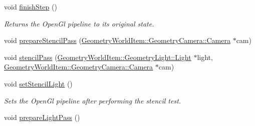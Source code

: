 \begin{DoxyCompactItemize}
\item 
\mbox{\label{class_geometry_engine_1_1_geometry_render_step_1_1_lighting_pass_a980473c9d2e2e77ebdce9e56454f3d3f}} 
void \mbox{\hyperlink{class_geometry_engine_1_1_geometry_render_step_1_1_lighting_pass_a980473c9d2e2e77ebdce9e56454f3d3f}{finish\+Step}} ()
\begin{DoxyCompactList}\small\item\em Returns the Open\+Gl pipeline to its original state. \end{DoxyCompactList}\item 
void \mbox{\hyperlink{class_geometry_engine_1_1_geometry_render_step_1_1_lighting_pass_a1a3280c28b0750c7cad03f01d37374c7}{prepare\+Stencil\+Pass}} (\mbox{\hyperlink{class_geometry_engine_1_1_geometry_world_item_1_1_geometry_camera_1_1_camera}{Geometry\+World\+Item\+::\+Geometry\+Camera\+::\+Camera}} $\ast$cam)
\item 
void \mbox{\hyperlink{class_geometry_engine_1_1_geometry_render_step_1_1_lighting_pass_a42b7f335d4bebdbdd06c3bef142844c0}{stencil\+Pass}} (\mbox{\hyperlink{class_geometry_engine_1_1_geometry_world_item_1_1_geometry_light_1_1_light}{Geometry\+World\+Item\+::\+Geometry\+Light\+::\+Light}} $\ast$light, \mbox{\hyperlink{class_geometry_engine_1_1_geometry_world_item_1_1_geometry_camera_1_1_camera}{Geometry\+World\+Item\+::\+Geometry\+Camera\+::\+Camera}} $\ast$cam)
\item 
\mbox{\label{class_geometry_engine_1_1_geometry_render_step_1_1_lighting_pass_a576001cdaa8f2a377b926d9bcd7b2444}} 
void \mbox{\hyperlink{class_geometry_engine_1_1_geometry_render_step_1_1_lighting_pass_a576001cdaa8f2a377b926d9bcd7b2444}{set\+Stencil\+Light}} ()
\begin{DoxyCompactList}\small\item\em Sets the Open\+Gl pipeline after performing the stencil test. \end{DoxyCompactList}\item 
\mbox{\label{class_geometry_engine_1_1_geometry_render_step_1_1_lighting_pass_aab66c6267b48f6ddb6c867303bd5dab1}} 
void \mbox{\hyperlink{class_geometry_engine_1_1_geometry_render_step_1_1_lighting_pass_aab66c6267b48f6ddb6c867303bd5dab1}{prepare\+Light\+Pass}} ()

\end{DoxyCompactItemize}
